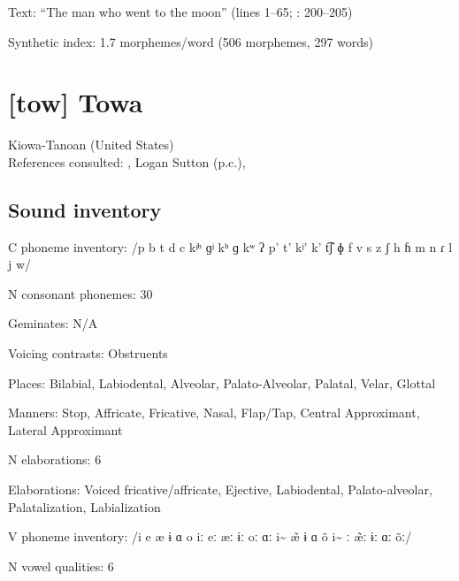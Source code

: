 {\begin{appendixdesc}
\item[Text:] “The man who went to the moon” (lines 1--65; \citealt{ThompsonThompson1992}: 200--205)

\item[Synthetic index:] 1.7 morphemes/word (506 morphemes, 297 words)
\end{appendixdesc}

\section*{[tow] Towa}  %
Kiowa-Tanoan (United States)\medskip\\
References consulted: \citet{Bell1993}, Logan Sutton (p.c.), \citet{Yumitani1998}

\subsection*{Sound inventory}
\begin{appendixdesc}

\item[C phoneme inventory:] /p b t d c kʲʰ ɡʲ kʰ ɡ kʷ ʔ p’ t’ kʲ’ k’ t͡ʃ ɸ f v s z ʃ h ɦ m n ɾ l j w/

\item[N consonant phonemes:] 30

\item[Geminates:] N/A

\item[Voicing contrasts:] Obstruents

\item[Places:] Bilabial, Labiodental, Alveolar, Palato-Alveolar, Palatal, Velar, Glottal

\item[Manners:] Stop, Affricate, Fricative, Nasal, Flap/Tap, Central Approximant, Lateral Approximant

\item[N elaborations:] 6

\item[Elaborations:] Voiced fricative/affricate, Ejective, Labiodental, Palato-alveolar, Palatalization, Labialization

\item[V phoneme inventory:] /i e æ ɨ ɑ o iː eː æː ɨː oː ɑː i\~{}  \~{æ} ɨ ɑ õ i\~{} ː \~{æ}ː ɨː ɑː õː/

\item[N vowel qualities:] 6


\end{appendixdesc}}
